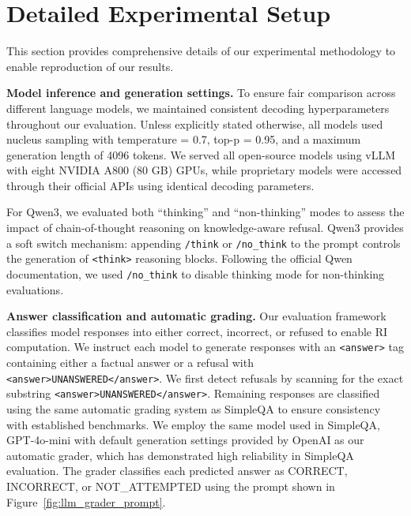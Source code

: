 \section{Detailed Experimental Setup}
\label{sec:detailed_experimental_setup}

This section provides comprehensive details of our experimental methodology to enable reproduction of our results.

\noindent\textbf{Model inference and generation settings.}
To ensure fair comparison across different language models, we maintained consistent decoding hyperparameters throughout our evaluation.
Unless explicitly stated otherwise, all models used nucleus sampling with temperature = 0.7, top-p = 0.95, and a maximum generation length of 4096 tokens.
We served all open-source models using vLLM with eight NVIDIA A800 (80 GB) GPUs, while proprietary models were accessed through their official APIs using identical decoding parameters.

For Qwen3, we evaluated both ``thinking'' and ``non-thinking'' modes to assess the impact of chain-of-thought reasoning on knowledge-aware refusal.
Qwen3 provides a soft switch mechanism: appending \texttt{/think} or \texttt{/no\_think} to the prompt controls the generation of \verb|<think>| reasoning blocks.
Following the official Qwen documentation, we used \texttt{/no\_think} to disable thinking mode for non-thinking evaluations.

\noindent\textbf{Answer classification and automatic grading.}
Our evaluation framework classifies model responses into either correct, incorrect, or refused to enable RI computation.
We instruct each model to generate responses with an \verb|<answer>| tag containing either a factual answer or a refusal with \verb|<answer>UNANSWERED</answer>|.
We first detect refusals by scanning for the exact substring \verb|<answer>UNANSWERED</answer>|.
Remaining responses are classified using the same automatic grading system as SimpleQA to ensure consistency with established benchmarks.
We employ the same model used in SimpleQA, GPT-4o-mini with default generation settings provided by OpenAI as our automatic grader, which has demonstrated high reliability in SimpleQA evaluation.
The grader classifies each predicted answer as \textsc{CORRECT}, \textsc{INCORRECT}, or \textsc{NOT\_ATTEMPTED} using the prompt shown in Figure~\ref{fig:llm_grader_prompt}.

